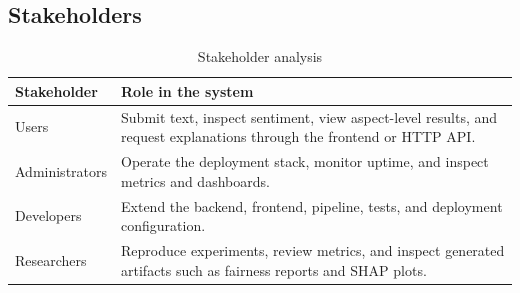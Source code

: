 \documentclass[12pt, a4paper]{article}
\begin{document}
\subsection{Stakeholders}
\begin{table}[H]
\centering
\caption{Stakeholder analysis}
\begin{tabularx}{\textwidth}{@{} p{3.2cm} X @{}}
\toprule
\textbf{Stakeholder} & \textbf{Role in the system} \\
\midrule
Users & Submit text, inspect sentiment, view aspect-level results, and request explanations through the frontend or HTTP API. \\
Administrators & Operate the deployment stack, monitor uptime, and inspect metrics and dashboards. \\
Developers & Extend the backend, frontend, pipeline, tests, and deployment configuration. \\
Researchers & Reproduce experiments, review metrics, and inspect generated artifacts such as fairness reports and SHAP plots. \\
\bottomrule
\end{tabularx}
\end{table}
\end{document}
